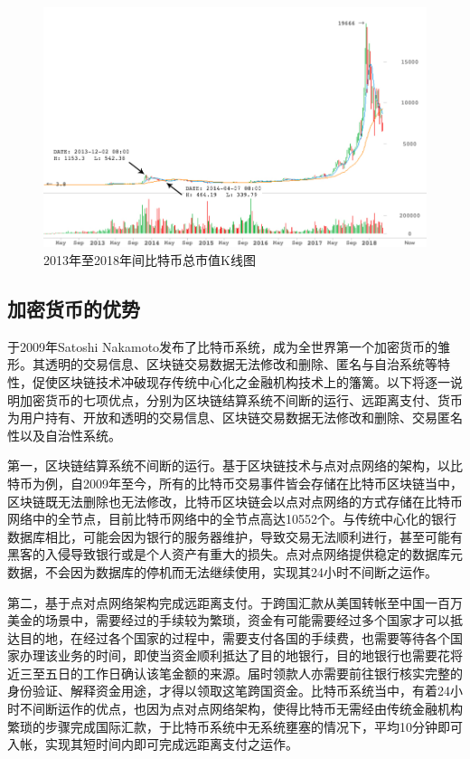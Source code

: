 			\begin{figure}[!htbp]
				\centering
				\includegraphics[width = 1\textwidth]{Thetotalmarketcapitalization.jpg}
				\caption{2013年至2018年间比特币总市值K线图\supercite{CryptocurrencyMarketCapitalizations}}\label{Thetotalmarketcapitalization}
			\end{figure}
		

			\subsection{加密货币的优势}
			于2009年Satoshi Nakamoto发布了比特币系统，成为全世界第一个加密货币的雏形。其透明的交易信息、区块链交易数据无法修改和删除、匿名与⾃治系统等特性，促使区块链技术冲破现存传统中⼼化之⾦融机构技术上的籓篱。以下将逐一说明加密货币的七项优点，分别为区块链结算系统不间断的运行、远距离支付、货币为用户持有、开放和透明的交易信息、区块链交易数据无法修改和删除、交易匿名性以及自治性系统。

				第一，区块链结算系统不间断的运行。基于区块链技术与点对点网络的架构，以比特币为例，自2009年至今，所有的比特币交易事件皆会存储在比特币区块链当中，区块链既无法删除也无法修改，比特币区块链会以点对点网络的方式存储在比特币网络中的全节点\supercite{YouReallyShouldRunaBitcoinFullNode:HeresWhy}，目前比特币网络中的全节点高达10552个。与传统中心化的银行数据库相比，可能会因为银行的服务器维护，导致交易无法顺利进行，甚至可能有黑客的入侵导致银行或是个人资产有重大的损失。点对点网络提供稳定的数据库元数据，不会因为数据库的停机而无法继续使用，实现其24小时不间断之运作。
				
				第二，基于点对点网络架构完成远距离支付。于跨国汇款从美国转帐至中国一百万美金的场景中，需要经过的手续较为繁琐，资金有可能需要经过多个国家才可以抵达目的地，在经过各个国家的过程中，需要支付各国的手续费，也需要等待各个国家办理该业务的时间，即使当资金顺利抵达了目的地银行，目的地银行也需要花将近三至五日的工作日确认该笔金额的来源。届时领款人亦需要前往银行核实完整的身份验证、解释资金用途，才得以领取这笔跨国资金。比特币系统当中，有着24小时不间断运作的优点，也因为点对点网络架构，使得比特币无需经由传统金融机构繁琐的步骤完成国际汇款，于比特币系统中无系统壅塞的情况下，平均10分钟即可入帐，实现其短时间内即可完成远距离支付之运作。

